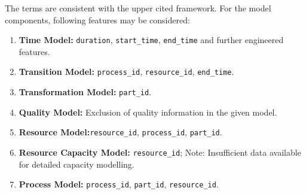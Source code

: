 The terms are consistent with the upper cited framework. For the model components, following features may be considered:

\begin{enumerate}
  \item \textbf{Time Model:} \texttt{duration}, \texttt{start\_time}, \texttt{end\_time} and further engineered features.

  \item \textbf{Transition Model:} \texttt{process\_id}, \texttt{resource\_id}, \texttt{end\_time}.

  \item \textbf{Transformation Model:} \texttt{part\_id}.

  \item \textbf{Quality Model:} Exclusion of quality information in the given model.

  \item \textbf{Resource Model:}\texttt{resource\_id}, \texttt{process\_id}, \texttt{part\_id}.

  \item \textbf{Resource Capacity Model:} \texttt{resource\_id}; Note: Insufficient data available for detailed capacity modelling.

  \item \textbf{Process Model:} \texttt{process\_id}, \texttt{part\_id}, \texttt{resource\_id}.
\end{enumerate}

